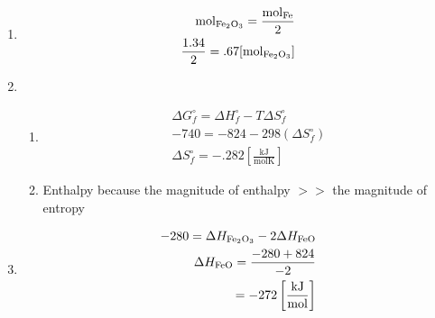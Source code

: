 \documentclass[12pt]{article}
\begin{document}
\begin{enumerate}
\begin{enumerate}
      \item 

        \begin{equation}
          \begin{split}
            \si{\mole}_{\ce{Fe2O3}}=\frac{\si{\mole}_{\ce{Fe}}}{2}\\
            \frac{1.34}{2}=.67[\si{\mole}_{\ce{Fe2O3}}]
          \end{split}
          \label{6}
        \end{equation}

      \item 

        \begin{enumerate}

          \item 

            \begin{equation}
              \begin{split}
                \Delta G^{\circ}_f=\Delta H^{\circ}_f - T\Delta S^{\circ}_f\\
                -740=-824-298(\Delta S^{\circ}_f)\\
                \Delta S^{\circ}_f=-.282\left[ \frac{\si{\kilo\joule}}{\si{\mole\kelvin}} \right]
              \end{split}
              \label{7}
            \end{equation}

          \item Enthalpy because the magnitude of enthalpy $>>$ the magnitude of entropy

        \end{enumerate}

      \item 

        \begin{equation}
          \begin{split}
            -280=\Delta H_{\ce{Fe2O3}}-2\Delta H_{\ce{FeO}}\\
            \Delta H_{\ce{FeO}}=\frac{-280+824}{-2}\\
            =-272\left[ \frac{\si{\kilo\joule}}{\si{\mole}} \right]
          \end{split}
          \label{8}
        \end{equation}

    \end{enumerate}

\end{enumerate}
\end{document}
